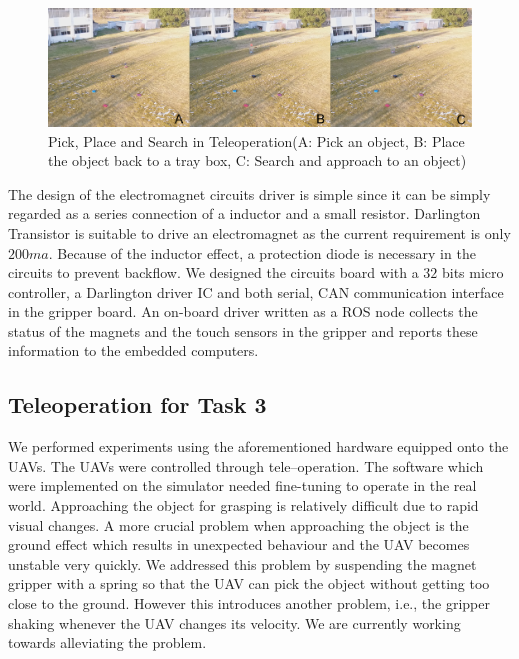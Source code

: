 \documentclass{standalone}
\begin{document}
 \begin{figure}%
    \begin{center}
    \includegraphics[keepaspectratio=true, width=1\linewidth, height=0.3\textheight]
    {sections//task3//images//teleop.png}
      \end{center}
    \caption{Pick, Place and Search in Teleoperation(A: Pick an object, B: Place the object back to a tray box, C: Search and approach to an object)}
    \label{task3tele}
    \end{figure}

    
The design of the electromagnet circuits driver is simple since it can
be simply regarded as a series connection of a inductor and a small
resistor. Darlington Transistor is suitable to drive an
electromagnet as the current requirement is only $200 ma$. Because of
the inductor effect, a protection diode is necessary in the
circuits to prevent backflow. We designed the circuits board with a
$32$ bits micro controller, a Darlington driver IC and both serial, CAN communication
interface in the gripper board. An on-board driver written as a ROS node
collects the status of the magnets and the touch sensors in the
gripper and reports these information to the embedded computers.



\subsection{Teleoperation for Task 3}

We performed experiments using the aforementioned hardware equipped
onto the UAVs. The UAVs were controlled through tele--operation. The
software which were implemented on the simulator needed
fine-tuning to operate in the real world. Approaching the object for
grasping is relatively difficult due to rapid visual changes. A more
crucial problem when approaching the object is the ground effect which 
results in unexpected behaviour and the UAV becomes unstable very
quickly. We addressed this problem by suspending the magnet gripper with
a spring so that the UAV can pick the object without getting too close
to the ground. However this introduces another problem, i.e., 
the gripper shaking whenever the UAV changes its velocity. We are
currently working towards alleviating the problem.
\end{document}
